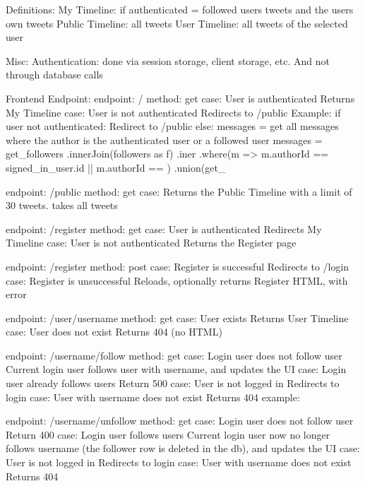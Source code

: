 Definitions:
    My Timeline: if authenticated = followed users tweets and the users own tweets
    Public Timeline: all tweets
    User Timeline: all tweets of the selected user

Misc:
    Authentication: done via session storage, client storage, etc. And not through database calls

Frontend Endpoint:
    endpoint: /
        method: get
        case: User is authenticated
            Returns My Timeline
        case: User is not authenticated
            Redirects to /public
        Example: 
            if user not authenticated:
                Redirect to /public
            else:
                messages = get all messages where the author is the authenticated user or a followed user
                messages = get_followers
                    .innerJoin(followers as f)
                    .iner
                    .where(m => m.authorId == signed_in_user.id || m.authorId == )
                    .union(get_

                
    
    endpoint: /public
        method: get
        case:
            Returns the Public Timeline with a limit of 30 tweets. takes all tweets
    
    endpoint: /register
        method: get
        case: User is authenticated
            Redirects My Timeline
        case: User is not authenticated
            Returns the Register page
    
    endpoint: /register
        method: post
        case: Register is successful
            Redirects to /login
        case: Register is unsuccessful 
            Reloads, optionally returns Register HTML, with error
    
    endpoint: /user/{username}
        method: get
        case: User exists
            Returns User Timeline
        case: User does not exist
            Returns 404 (no HTML)

    endpoint: /{username}/follow
        method: get
        case: Login user does not follow user 
            Current login user follows user with {username}, and updates the UI
        case: Login user already follows users
            Return 500
        case: User is not logged in
            Redirects to login
        case: User with username does not exist
            Returns 404
        example: 
                
    endpoint: /{username}/unfollow
        method: get
        case: Login user does not follow user 
            Return 400
        case: Login user follows users
            Current login user now no longer follows {username} (the follower row is deleted in the db), and updates the UI
        case: User is not logged in
            Redirects to login
        case: User with username does not exist
            Returns 404
            
